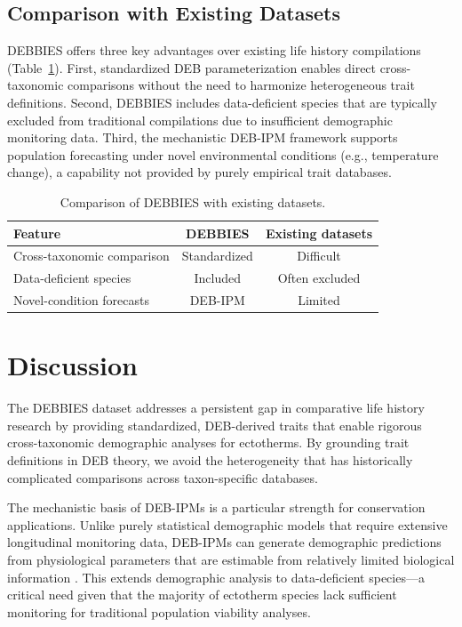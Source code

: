\documentclass[11pt]{article}
\begin{document}
\subsection{Comparison with Existing Datasets}

DEBBIES offers three key advantages over existing life history compilations (Table~\ref{tab:comparison}). First, standardized DEB parameterization enables direct cross-taxonomic comparisons without the need to harmonize heterogeneous trait definitions. Second, DEBBIES includes data-deficient species that are typically excluded from traditional compilations due to insufficient demographic monitoring data. Third, the mechanistic DEB-IPM framework supports population forecasting under novel environmental conditions (e.g., temperature change), a capability not provided by purely empirical trait databases.

\begin{table}[h]
\centering
\caption{Comparison of DEBBIES with existing datasets.}
\label{tab:comparison}
\begin{tabular}{lcc}
\toprule
Feature & DEBBIES & Existing datasets \\
\midrule
Cross-taxonomic comparison & Standardized & Difficult \\
Data-deficient species & Included & Often excluded \\
Novel-condition forecasts & DEB-IPM & Limited \\
\bottomrule
\end{tabular}
\end{table}

\section{Discussion}

The DEBBIES dataset addresses a persistent gap in comparative life history research by providing standardized, DEB-derived traits that enable rigorous cross-taxonomic demographic analyses for ectotherms. By grounding trait definitions in DEB theory, we avoid the heterogeneity that has historically complicated comparisons across taxon-specific databases.

The mechanistic basis of DEB-IPMs is a particular strength for conservation applications. Unlike purely statistical demographic models that require extensive longitudinal monitoring data, DEB-IPMs can generate demographic predictions from physiological parameters that are estimable from relatively limited biological information \citep{kooijman2010,nisbet2000}. This extends demographic analysis to data-deficient species---a critical need given that the majority of ectotherm species lack sufficient monitoring for traditional population viability analyses.
\end{document}
